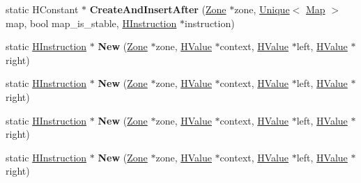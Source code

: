 \begin{DoxyCompactItemize}
\item 
\hypertarget{classv8_1_1internal_1_1_v8___f_i_n_a_l_a3a923e3944b493d64ad111b524b8ef44}{}static H\+Constant $\ast$ {\bfseries Create\+And\+Insert\+After} (\hyperlink{classv8_1_1internal_1_1_zone}{Zone} $\ast$zone, \hyperlink{classv8_1_1internal_1_1_unique}{Unique}$<$ \hyperlink{classv8_1_1internal_1_1_map}{Map} $>$ map, bool map\+\_\+is\+\_\+stable, \hyperlink{classv8_1_1internal_1_1_h_instruction}{H\+Instruction} $\ast$instruction)\label{classv8_1_1internal_1_1_v8___f_i_n_a_l_a3a923e3944b493d64ad111b524b8ef44}

\item 
\hypertarget{classv8_1_1internal_1_1_v8___f_i_n_a_l_ae2081c07c94daaf9b4f002f76d618c00}{}static \hyperlink{classv8_1_1internal_1_1_h_instruction}{H\+Instruction} $\ast$ {\bfseries New} (\hyperlink{classv8_1_1internal_1_1_zone}{Zone} $\ast$zone, \hyperlink{classv8_1_1internal_1_1_h_value}{H\+Value} $\ast$context, \hyperlink{classv8_1_1internal_1_1_h_value}{H\+Value} $\ast$left, \hyperlink{classv8_1_1internal_1_1_h_value}{H\+Value} $\ast$right)\label{classv8_1_1internal_1_1_v8___f_i_n_a_l_ae2081c07c94daaf9b4f002f76d618c00}

\item 
\hypertarget{classv8_1_1internal_1_1_v8___f_i_n_a_l_ae2081c07c94daaf9b4f002f76d618c00}{}static \hyperlink{classv8_1_1internal_1_1_h_instruction}{H\+Instruction} $\ast$ {\bfseries New} (\hyperlink{classv8_1_1internal_1_1_zone}{Zone} $\ast$zone, \hyperlink{classv8_1_1internal_1_1_h_value}{H\+Value} $\ast$context, \hyperlink{classv8_1_1internal_1_1_h_value}{H\+Value} $\ast$left, \hyperlink{classv8_1_1internal_1_1_h_value}{H\+Value} $\ast$right)\label{classv8_1_1internal_1_1_v8___f_i_n_a_l_ae2081c07c94daaf9b4f002f76d618c00}

\item 
\hypertarget{classv8_1_1internal_1_1_v8___f_i_n_a_l_ae2081c07c94daaf9b4f002f76d618c00}{}static \hyperlink{classv8_1_1internal_1_1_h_instruction}{H\+Instruction} $\ast$ {\bfseries New} (\hyperlink{classv8_1_1internal_1_1_zone}{Zone} $\ast$zone, \hyperlink{classv8_1_1internal_1_1_h_value}{H\+Value} $\ast$context, \hyperlink{classv8_1_1internal_1_1_h_value}{H\+Value} $\ast$left, \hyperlink{classv8_1_1internal_1_1_h_value}{H\+Value} $\ast$right)\label{classv8_1_1internal_1_1_v8___f_i_n_a_l_ae2081c07c94daaf9b4f002f76d618c00}

\item 
\hypertarget{classv8_1_1internal_1_1_v8___f_i_n_a_l_ae2081c07c94daaf9b4f002f76d618c00}{}static \hyperlink{classv8_1_1internal_1_1_h_instruction}{H\+Instruction} $\ast$ {\bfseries New} (\hyperlink{classv8_1_1internal_1_1_zone}{Zone} $\ast$zone, \hyperlink{classv8_1_1internal_1_1_h_value}{H\+Value} $\ast$context, \hyperlink{classv8_1_1internal_1_1_h_value}{H\+Value} $\ast$left, \hyperlink{classv8_1_1internal_1_1_h_value}{H\+Value} $\ast$right)\label{classv8_1_1internal_1_1_v8___f_i_n_a_l_ae2081c07c94daaf9b4f002f76d618c00}


\end{DoxyCompactItemize}
